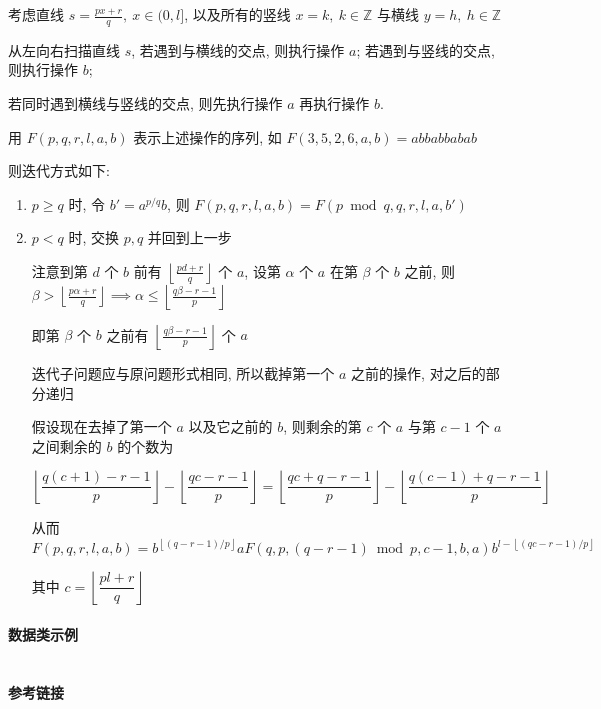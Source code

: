 考虑直线 \(s=\frac{px+r}{q},~x\in (0,l]\), 以及所有的竖线 \(x=k,~k\in\mathbb{Z}\) 与横线 \(y=h,~h\in\mathbb{Z}\)

从左向右扫描直线 \(s\), 若遇到与横线的交点, 则执行操作 \(a\); 若遇到与竖线的交点, 则执行操作 \(b\);

若同时遇到横线与竖线的交点, 则先执行操作 \(a\) 再执行操作 \(b\).

用 \(F(p,q,r,l,a,b)\) 表示上述操作的序列, 如 \(F(3,5,2,6,a,b)=abbabbabab\)

则迭代方式如下:

\begin{enumerate}
    \item \(p\geq q\) 时, 令 \(b'=a^{p/q}b\), 则 \(F(p,q,r,l,a,b)=F(p\bmod q,q,r,l,a,b')\)
    \item \(p<q\) 时, 交换 \(p,q\) 并回到上一步

          注意到第 \(d\) 个 \(b\) 前有 \(\left\lfloor\frac{pd+r}{q}\right\rfloor\) 个 \(a\), 设第 \(\alpha\) 个 \(a\) 在第 \(\beta\) 个 \(b\) 之前, 则 \(\displaystyle \beta > \left\lfloor\frac{p\alpha+r}{q}\right\rfloor \implies \alpha \leq \left\lfloor\frac{q\beta-r-1}{p}\right\rfloor\)

          即第 \(\beta\) 个 \(b\) 之前有 \(\left\lfloor\frac{q\beta-r-1}{p}\right\rfloor\) 个 \(a\)

          迭代子问题应与原问题形式相同, 所以截掉第一个 \(a\) 之前的操作, 对之后的部分递归

          假设现在去掉了第一个 \(a\) 以及它之前的 \(b\), 则剩余的第 \(c\) 个 \(a\) 与第 \(c-1\) 个 \(a\) 之间剩余的 \(b\) 的个数为

          \[
              \left\lfloor\frac{q(c+1)-r-1}{p}\right\rfloor-\left\lfloor\frac{qc-r-1}{p}\right\rfloor=\left\lfloor\frac{qc+q-r-1}{p}\right\rfloor-\left\lfloor\frac{q(c-1)+q-r-1}{p}\right\rfloor
          \]

          从而 \(\displaystyle F(p,q,r,l,a,b)=b^{\left\lfloor (q-r-1)/p \right\rfloor}aF(q,p,(q-r-1)\bmod p,c-1,b,a)b^{l-\left\lfloor (qc-r-1)/p \right\rfloor}\)

          其中 \(c=\left\lfloor\dfrac{pl+r}{q}\right\rfloor\)
\end{enumerate}

\paragraph{数据类示例}

\inputminted{cpp}{src/src/exeuclid_node.cpp}

\paragraph{参考链接}

